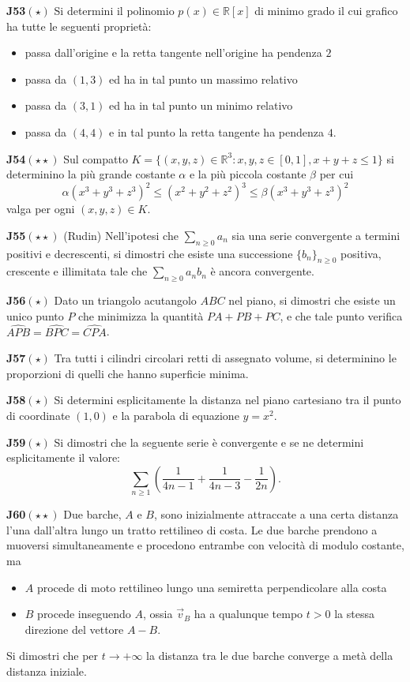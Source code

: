 \documentclass[a4paper,twoside]{article}
\theoremstyle{definition}
\numberwithin{theorem}{section}
\begin{document}
\textbf{J53}$(\star)$ Si determini il polinomio $p(x)\in\mathbb{R}[x]$ di minimo grado il cui grafico ha tutte le seguenti proprietà:
\begin{itemize}
\item passa dall'origine e la retta tangente nell'origine ha pendenza $2$
\item passa da $(1,3)$ ed ha in tal punto un massimo relativo
\item passa da $(3,1)$ ed ha in tal punto un minimo relativo
\item passa da $(4,4)$ e in tal punto la retta tangente ha pendenza $4$.
\end{itemize}
\textbf{J54}$(\star\star)$ Sul compatto $K=\{(x,y,z)\in\mathbb{R}^3: x,y,z\in[0,1], x+y+z\leq 1\}$ si determinino la più grande costante $\alpha$ e la più piccola costante $\beta$ per cui
$$\alpha (x^3+y^3+z^3)^2\leq  (x^2+y^2+z^2)^3 \leq \beta (x^3+y^3+z^3)^2$$
valga per ogni $(x,y,z)\in K$.

\textbf{J55}$(\star\star)$ (Rudin) Nell'ipotesi che $\sum_{n\geq 0}a_n$ sia una serie convergente a termini positivi e decrescenti, si dimostri che esiste una successione $\{b_n\}_{n\geq 0}$ positiva, crescente e illimitata tale che $\sum_{n\geq 0}a_n b_n$ è ancora convergente.

\textbf{J56}$(\star)$ Dato un triangolo acutangolo $ABC$ nel piano, si dimostri che esiste un unico punto $P$ che minimizza la quantità $PA+PB+PC$, e che tale punto verifica $\widehat{APB}=\widehat{BPC}=\widehat{CPA}$.

\textbf{J57}$(\star)$ Tra tutti i cilindri circolari retti di assegnato volume, si determinino le proporzioni di quelli che hanno superficie minima.

\textbf{J58}$(\star)$ Si determini esplicitamente la distanza nel piano cartesiano tra il punto di coordinate $(1,0)$ e la parabola di equazione $y=x^2$.

\textbf{J59}$(\star)$ Si dimostri che la seguente serie è convergente e se ne determini esplicitamente il valore:
$$\sum_{n\geq 1}\left(\frac{1}{4n-1}+\frac{1}{4n-3}-\frac{1}{2n}\right).$$

\textbf{J60}$(\star\star)$ Due barche, $A$ e $B$, sono inizialmente attraccate a una certa distanza l'una dall'altra lungo un tratto rettilineo di costa. Le due barche prendono a muoversi simultaneamente e procedono entrambe con velocità di modulo costante, ma
\begin{itemize}
\item $A$ procede di moto rettilineo lungo una semiretta perpendicolare alla costa
\item $B$ procede inseguendo $A$, ossia $\vec{v}_B$ ha a qualunque tempo $t>0$ la stessa direzione del vettore $A-B$.
\end{itemize}
Si dimostri che per $t\to +\infty$ la distanza tra le due barche converge a metà della distanza iniziale.  
\end{document}
